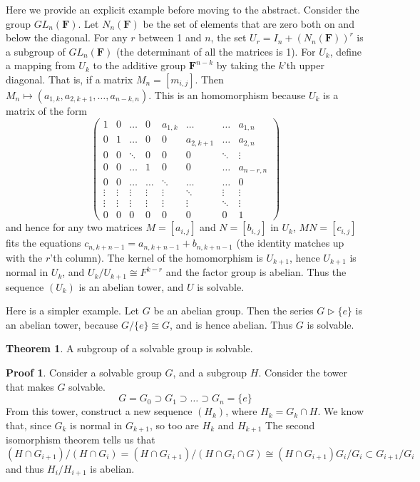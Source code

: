 \documentclass[12pt]{amsbook}
\theoremstyle{definition}
\newtheorem{theorem}{Theorem}[chapter]
\newtheorem*{prf}{Proof}
\begin{document}
Here we provide an explicit example before moving to the abstract. Consider the group $GL_n(\mathbf{F})$. Let $N_n(\mathbf{F})$ be the set of elements that are zero both on and below the diagonal. For any $r$ between 1 and $n$, the set $U_r = I_n + (N_n(\mathbf{F}))^{r}$ is a subgroup of $GL_n(\mathbf{F})$ (the determinant of all the matrices is 1). For $U_k$, define a mapping from $U_k$ to the additive group $\mathbf{F}^{n-k}$ by taking the $k$'th upper diagonal. That is, if a matrix $M_n = [m_{i,j}]$. Then $M_n \mapsto (a_{1,k}, a_{2,k+1}, \dots, a_{n-k,n})$. This is an homomorphism because $U_k$ is a matrix of the form
%
\[ \begin{pmatrix} 1 & 0 & \dots & 0 & a_{1,k} & \dots & \dots & a_{1,n}\\
                   0 & 1 & \dots & 0 & 0 & a_{2,k+1} & \dots & a_{2,n}\\
                   0 & 0 & \ddots & 0 & 0 & 0 & \ddots & \vdots\\
                   0 & 0 & \dots & 1 & 0 & 0 & \dots & a_{n-r,n}\\
                   0 & 0 & \dots & \dots & \ddots & \dots & \dots & 0\\
                   \vdots & \vdots & \vdots & \vdots & \vdots & \ddots & \vdots & \vdots\\
                   \vdots & \vdots & \vdots & \vdots & \vdots & \vdots & \ddots & \vdots\\
                   0 & 0 & 0 & 0 & 0 & 0 & 0 & 1 \end{pmatrix} \]
%
and hence for any two matrices $M = [a_{i,j}]$ and $N = [b_{i,j}]$ in $U_k$, $MN = [c_{i,j}]$ fits the equations $c_{n,k + n - 1} = a_{n,k + n - 1} + b_{n,k + n - 1}$ (the identity matches up with the $r$'th column). The kernel of the homomorphism is $U_{k+1}$, hence $U_{k+1}$ is normal in $U_k$, and $U_k/U_{k+1} \cong F^{k-r}$ and the factor group is abelian. Thus the sequence $(U_k)$ is an abelian tower, and $U$ is solvable.

Here is a simpler example. Let $G$ be an abelian group. Then the series $G \rhd \{e\}$ is an abelian tower, because $G/\{e\} \cong G$, and is hence abelian. Thus $G$ is solvable.

\begin{theorem}
    A subgroup of a solvable group is solvable.
\end{theorem}
\begin{prf}
    Consider a solvable group $G$, and a subgroup $H$. Consider the tower that makes $G$ solvable.
    \[ G = G_0 \supset G_1 \supset \dots \supset G_n = \{ e \} \]
    From this tower, construct a new sequence $(H_k)$, where $H_k = G_k \cap H$. We know that, since $G_k$ is normal in $G_{k+1}$, so too are $H_k$ and $H_{k+1}$ The second isomorphism theorem tells us that
    \[ (H \cap G_{i+1})/(H \cap G_i) = (H \cap G_{i+1})/(H \cap G_i \cap G) \cong (H \cap G_{i+1})G_i/G_i \subset G_{i+1}/G_i \]
    and thus $H_i/H_{i+1}$ is abelian.
\end{prf}
\end{document}
